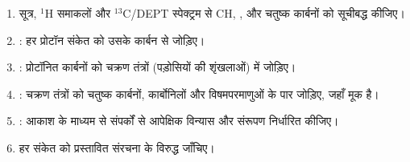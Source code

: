 \begin{method}\label{met:b3:advanced-nmr:solve-2d}
\begin{enumerate}
  \item सूत्र, ${}^1$H समाकलों और ${}^{13}$C/DEPT स्पेक्ट्रम से
        CH, ,  और चतुष्क कार्बनों को सूचीबद्ध कीजिए।
  \item {}: हर प्रोटॉन संकेत को उसके कार्बन से जोड़िए।
  \item {}: प्रोटॉनित कार्बनों को चक्रण तंत्रों (पड़ोसियों की
        शृंखलाओं) में जोड़िए।
  \item {}: चक्रण तंत्रों को चतुष्क कार्बनों, कार्बोनिलों और
        विषमपरमाणुओं के पार जोड़िए, जहाँ  मूक है।
  \item {}: आकाश के माध्यम से संपर्कों से आपेक्षिक विन्यास और संरूपण
        निर्धारित कीजिए।
  \item हर संकेत को प्रस्तावित संरचना के विरुद्ध जाँचिए।
\end{enumerate}
\end{method}

